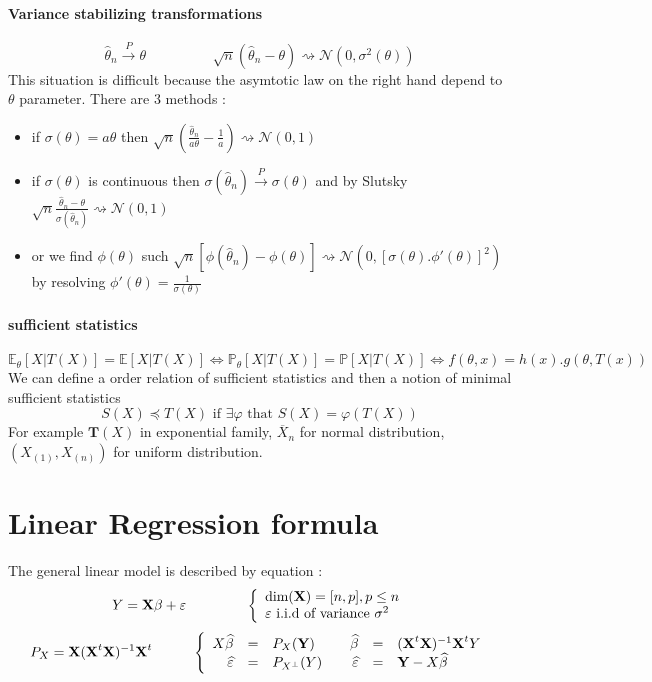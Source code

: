 \documentclass[a4paper,10pt]{article}
\begin{document}
\paragraph{Variance stabilizing transformations}
\[
\widehat{\theta}_n \xrightarrow{P} \theta
\hspace{2cm}
\sqrt{n}(\widehat{\theta}_n - \theta) \rightsquigarrow   \mathcal{N}(0,\sigma^{2}(\theta))
\]
This situation is difficult because the asymtotic law on the right hand depend to $\theta$ parameter. There are 3 methods :
\begin{itemize}
 \item if $\sigma(\theta)=a\theta$ then $\sqrt{n}(\frac{\widehat{\theta}_n}{a\theta} - \frac{1}{a}) \rightsquigarrow   \mathcal{N}(0,1)$
 \item if $\sigma(\theta)$ is continuous then $\sigma(\widehat{\theta}_n) \xrightarrow{P} \sigma(\theta)$ and by Slutsky
$\sqrt{n}\frac{\widehat{\theta}_n - \theta}{\sigma(\widehat{\theta}_n)} \rightsquigarrow   \mathcal{N}(0,1)$
 \item or we find $\phi(\theta)$ such $\sqrt{n}[\phi(\widehat{\theta}_n) - \phi(\theta)] \rightsquigarrow   \mathcal{N}(0,[\sigma(\theta).\phi'(\theta)]^2)$
by resolving $\phi'(\theta) = \frac{1}{\sigma(\theta)}$
\end{itemize}
\paragraph{sufficient statistics}
\[
\mathbb{E}_{\theta}[X|T(X)] = \mathbb{E}[X|T(X)]  \Longleftrightarrow
\mathbb{P}_{\theta}[X|T(X)] = \mathbb{P}[X|T(X)]  \Longleftrightarrow 
f(\theta, x) = h(x).g(\theta, T(x))
\]
We can define a order relation of sufficient statistics and then a notion of minimal sufficient statistics
\[
S(X) \preccurlyeq T(X) \text{ if } \exists \varphi \text{ that } S(X) = \varphi(T(X))
\]
For example $\textbf{T}(X)$ in exponential family, $\overline{X}_n$ for normal distribution, $(X_{(1)},X_{(n)})$ for uniform distribution. 

\section{Linear Regression formula}
The general linear model is described by equation :
\[
Y = \textbf{X} \beta + \varepsilon    
\hspace{1.5cm} 
\left\{
\begin{array}{l}
 \text{dim}(\textbf{X})=[n,p] , p\leq n \\
 \varepsilon \text{  i.i.d of variance }\sigma^2
\end{array}\right. 
\]
\[
P_{X} = \textbf{X}(\textbf{X}^t \textbf{X})^{-1} \textbf{X}^t
\hspace{10mm}
\left\{
\begin{array}{rclcrcl}
X\widehat{\beta} &=& P_{X}(\textbf{Y}) 
& &
\widehat{\beta} &=& (\textbf{X}^t \textbf{X})^{-1} \textbf{X}^t Y \\
\widehat{\varepsilon} &=& P_{X^\bot}(Y)
& &
\widehat{\varepsilon} &=& \textbf{Y} - X\widehat{\beta}
\end{array}\right. 
\]
\end{document}
